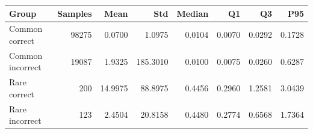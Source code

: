 \begin{tabular}{lrrrrrrr}
\toprule
Group & Samples & Mean & Std & Median & Q1 & Q3 & P95 \\
\midrule
Common correct & 98275 & 0.0700 & 1.0975 & 0.0104 & 0.0070 & 0.0292 & 0.1728 \\
Common incorrect & 19087 & 1.9325 & 185.3010 & 0.0100 & 0.0075 & 0.0260 & 0.6287 \\
Rare correct & 200 & 14.9975 & 88.8975 & 0.4456 & 0.2960 & 1.2581 & 3.0439 \\
Rare incorrect & 123 & 2.4504 & 20.8158 & 0.4480 & 0.2774 & 0.6568 & 1.7364 \\
\bottomrule
\end{tabular}
